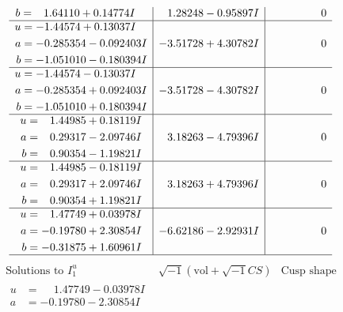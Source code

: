 \documentclass[1p]{elsarticle_modified}
\theoremstyle{definition}
\newcommand{\I}{\sqrt{-1}}
\begin{document}
$$\begin{array}{c|c|c}
\begin{aligned}
b &= \phantom{-}1.64110 + 0.14774 I\end{aligned}
 & \phantom{-}1.28248 - 0.95897 I & \phantom{-0.000000 } 0 \\ \hline\begin{aligned}
u &= -1.44574 + 0.13037 I \\
a &= -0.285354 - 0.092403 I \\
b &= -1.051010 - 0.180394 I\end{aligned}
 & -3.51728 + 4.30782 I & \phantom{-0.000000 } 0 \\ \hline\begin{aligned}
u &= -1.44574 - 0.13037 I \\
a &= -0.285354 + 0.092403 I \\
b &= -1.051010 + 0.180394 I\end{aligned}
 & -3.51728 - 4.30782 I & \phantom{-0.000000 } 0 \\ \hline\begin{aligned}
u &= \phantom{-}1.44985 + 0.18119 I \\
a &= \phantom{-}0.29317 - 2.09746 I \\
b &= \phantom{-}0.90354 - 1.19821 I\end{aligned}
 & \phantom{-}3.18263 - 4.79396 I & \phantom{-0.000000 } 0 \\ \hline\begin{aligned}
u &= \phantom{-}1.44985 - 0.18119 I \\
a &= \phantom{-}0.29317 + 2.09746 I \\
b &= \phantom{-}0.90354 + 1.19821 I\end{aligned}
 & \phantom{-}3.18263 + 4.79396 I & \phantom{-0.000000 } 0 \\ \hline\begin{aligned}
u &= \phantom{-}1.47749 + 0.03978 I \\
a &= -0.19780 + 2.30854 I \\
b &= -0.31875 + 1.60961 I\end{aligned}
 & -6.62186 - 2.92931 I & \phantom{-0.000000 } 0\\
 \hline 
 \end{array}$$\newpage$$\begin{array}{c|c|c}  
\text{Solutions to }I^u_{1}& \I (\text{vol} + \sqrt{-1}CS) & \text{Cusp shape}\\
 \hline 
\begin{aligned}
u &= \phantom{-}1.47749 - 0.03978 I \\
a &= -0.19780 - 2.30854 I \\

\end{aligned}
\end{array}$$
\end{document}
